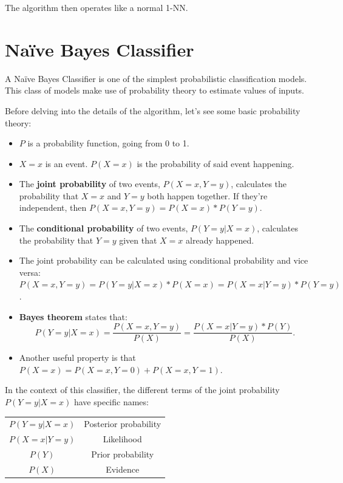 The algorithm then operates like a normal 1-NN.

\section{Naïve Bayes Classifier}

A Naïve Bayes Classifier is one of the simplest probabilistic classification models. This class of models make use of probability theory to estimate values of inputs.

Before delving into the details of the algorithm, let's see some basic probability theory:

\begin{itemize}
    \item $P$ is a probability function, going from 0 to 1.
    \item $X=x$ is an event. $P(X=x)$ is the probability of said event happening.
    \item The \textbf{joint probability} of two events, $P(X=x, Y=y)$, calculates the probability that $X=x$ and $Y=y$ both happen together. If they're independent, then $P(X=x, Y=y) = P(X=x) * P(Y=y)$.
    \item The \textbf{conditional probability} of two events, $P(Y=y|X=x)$, calculates the probability that $Y=y$ given that $X=x$ already happened.
    \item The joint probability can be calculated using conditional probability and vice versa: $P(X=x,Y=y) = P(Y=y|X=x) * P(X=x) = P(X=x|Y=y) * P(Y=y)$.
    \item \textbf{Bayes theorem} states that:
    \begin{equation*}
    P(Y=y|X=x) = \dfrac{P(X=x,Y=y)}{P(X)} = \dfrac{P(X=x|Y=y) * P(Y)}{P(X)}.
    \end{equation*}
    \item Another useful property is that $P(X=x) = P(X=x, Y=0) + P(X=x, Y=1)$.
\end{itemize}

In the context of this classifier, the different terms of the joint probability $P(Y=y|X=x)$ have specific names:

\begin{table}[h]
    \centering
    \begin{tabular}{c|c}
        $P(Y=y|X=x)$ & Posterior probability\\
        $P(X=x|Y=y)$ & Likelihood \\
        $P(Y)$ & Prior probability \\
        $P(X)$ & Evidence \\
    \end{tabular}
\end{table}

